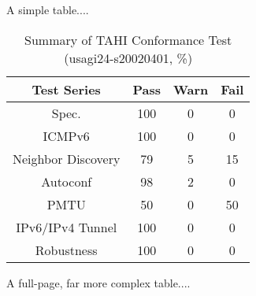 
A simple table....

\begin{table}[tbph]
\begin{center}
\caption{Summary of TAHI Conformance Test (usagi24-s20020401, \%)\label{tahi-usagi24}}
\begin{tabular}{|c|c|c|c|}
\hline
Test Series             & Pass          &       Warn    &       Fail    \\
\hline
\hline
Spec.                   &       100     &       0       &       0       \\
ICMPv6                  &       100     &       0       &       0       \\
Neighbor Discovery      &       79      &       5       &       15      \\
Autoconf                &       98      &       2       &       0       \\
PMTU                    &       50      &       0       &       50      \\
IPv6/IPv4 Tunnel        &       100     &       0       &       0       \\
Robustness              &       100     &       0       &       0       \\
\hline
\end{tabular}
\end{center}
\end{table}


A full-page, far more complex table....

